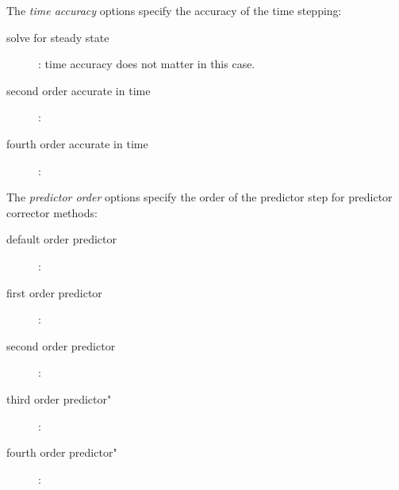 \documentclass{article}
\begin{document}
\noindent The {\em time accuracy} options specify the accuracy of the time stepping:
\begin{description}
  \item[\qquad solve for steady state] : time accuracy does not matter in this case. 
  \item[\qquad second order accurate in time ] : 
  \item[\qquad fourth order accurate in time ] : 
\end{description}

\noindent The {\em predictor order} options specify the order of the predictor step
for predictor corrector methods: 
\begin{description}
  \item[\qquad default order predictor] :
  \item[\qquad first order predictor] :
  \item[\qquad second order predictor] :
  \item[\qquad third order predictor"] :
  \item[\qquad fourth order predictor"] :
\end{description}

















\end{document}
